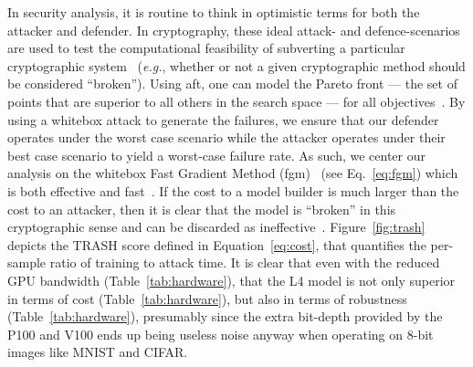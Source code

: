 \documentclass[sn-mathphys-num]{sn-jnl}%
\begin{document}
In security analysis, it is  routine to think in optimistic terms for both the attacker and defender. In cryptography, these ideal attack- and defence-scenarios are used to test the computational feasibility of subverting a particular cryptographic system~\cite{kamal2017study,leurent2020sha} (\textit{e.g.}, whether or not a given cryptographic method should be considered ``broken'').
Using \acrshort{aft}, one can model the Pareto front --- the set of points that are superior to all others in the search space --- for all objectives~\cite{zitzler2008quality}.
By using a whitebox attack to generate the failures, we ensure that our defender operates under the worst case scenario while the attacker operates under their best case scenario to yield a worst-case failure rate.
As such, we center our analysis on the whitebox Fast Gradient Method (\acrshort{fgm})~\cite{fgm} (see Eq.~\ref{eq:fgm}) which is both effective and fast~\cite{meyers}.
If the cost to a model builder is much larger than the cost to an attacker, then it is  clear that the model is ``broken'' in this cryptographic sense and can be discarded as ineffective~\cite{meyers_aft}.
Figure~\ref{fig:trash} depicts the TRASH score defined in Equation~\ref{eq:cost}, that quantifies the per-sample ratio of training to attack time.
It is clear that even with the reduced GPU bandwidth (Table~\ref{tab:hardware}), that the L4 model is not only superior in terms of cost (Table~\ref{tab:hardware}), but also in terms of robustness (Table~\ref{tab:hardware}), presumably since the extra bit-depth provided by the P100 and V100 ends up being useless noise anyway when operating on 8-bit images like MNIST and CIFAR\@.
\end{document}
